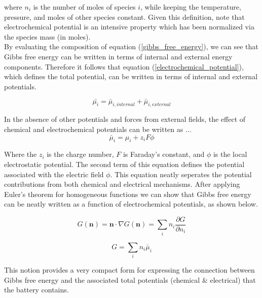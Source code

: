 \documentclass[lettersize,journal]{IEEEtran}
\begin{document}
 \noindent where $n_i$ is the number of moles of species $i$, while keeping the temperature, pressure, and moles of other species constant.  Given this definition, note that electrochemical potential is an intensive property which has been normalized via the species mass (in moles).\\

 By evaluating the composition of equation (\ref{gibbs_free_energy}), we can see that Gibbs free energy can be written in terms of internal and external energy components. Therefore it follows that equation (\ref{electrochemical_potential}), which defines the total potential, can be written in terms of internal and external potentials.

\begin{equation}
  \bar{\mu_{i}} = \bar{\mu}_{i, internal} + \bar{\mu}_{i, external}
\end{equation}

 In the absence of other potentials and forces from external fields, the effect of chemical and electrochemical potentials can be written as ...
 \begin{equation}\label{total_potential}
   \bar{\mu}_{i} = \mu_{i} + z_i F \phi
 \end{equation}

Where the $z_i$ is the charge number, $F$ is Faraday's constant, and $\phi$ is the local electrostatic potential. The second term of this equation defines the potential associated with the electric field $\phi$. This equation neatly seperates the potential contributions from both chemical and electrical mechanisms. After applying Euler's theorem for homogeneous functions we can show that Gibbs free energy can be neatly written as a function of electrochemical potentials, as shown below.

\begin{equation}
  G(\textbf{n}) = \textbf{n} \cdot \nabla G (\textbf{n}) = \sum_i n_i \frac{\partial G}{\partial n_i}
\end{equation}

\begin{equation}\label{gibbs_summation}
  G = \sum_i n_i \bar{\mu}_i
\end{equation}

\noindent This notion provides a very compact form for expressing the connection between Gibbs free energy and the associated total potentials (chemical \& electrical) that the battery contains.  \\
\end{document}
